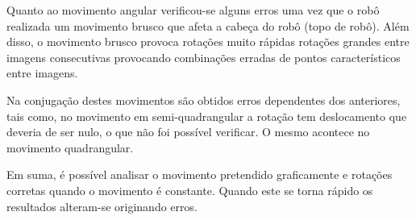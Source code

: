 Quanto ao movimento angular verificou-se alguns erros uma vez que o robô realizada um movimento brusco que afeta a cabeça  do robô (topo de robô). Além disso, o movimento brusco provoca rotações muito rápidas rotações grandes entre imagens consecutivas provocando combinações erradas de pontos característicos entre imagens.


Na conjugação destes movimentos são obtidos erros dependentes dos anteriores, tais como, no movimento em semi-quadrangular a rotação tem deslocamento que deveria de ser nulo, o que não foi possível verificar. O mesmo acontece no movimento quadrangular.


Em suma, é possível analisar o movimento pretendido graficamente e rotações corretas quando o movimento é constante. Quando este se torna rápido os resultados alteram-se originando erros. 

